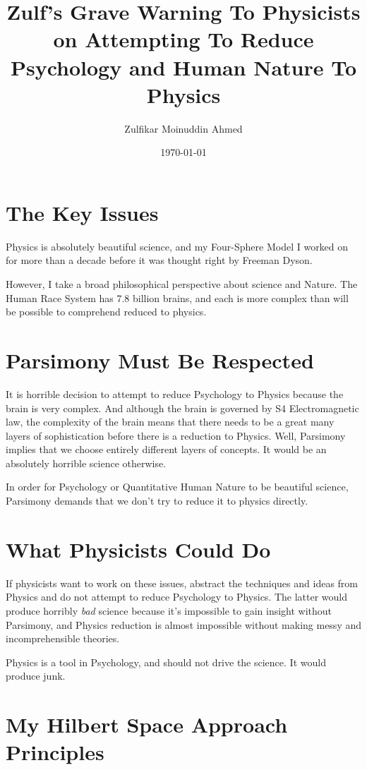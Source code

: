 \documentclass{amsart}
\title{Zulf's Grave Warning To Physicists on Attempting To Reduce Psychology and Human Nature To Physics}
\author{Zulfikar Moinuddin Ahmed}
\date{\today}
\begin{document}
\maketitle
\section{The Key Issues}
Physics is absolutely beautiful science, and my Four-Sphere Model I worked on for more than a decade before it was thought right by Freeman Dyson.

However, I take a broad philosophical perspective about science and Nature.  The Human Race System has 7.8 billion brains, and each is more complex than will be possible to comprehend reduced to physics.  

\section{Parsimony Must Be Respected}

It is horrible decision to attempt to reduce Psychology to Physics because the brain is very complex.  And although the brain is governed by S4 Electromagnetic law, the complexity of the brain means that there needs to be a great many layers of sophistication before there is a reduction to Physics.  Well, Parsimony implies that we choose entirely different layers of concepts.  It would be an absolutely horrible science otherwise.  

In order for Psychology or Quantitative Human Nature to be beautiful science, Parsimony demands that we don't try to reduce it to physics directly.

\section{What Physicists Could Do}
If physicists want to work on these issues, abstract the techniques and ideas from Physics and do not attempt to reduce Psychology to Physics.  The latter would produce horribly {\em bad} science because it's impossible to gain insight without Parsimony, and Physics reduction is almost impossible without making messy and incomprehensible theories.  

Physics is a tool in Psychology, and should not drive the science. It would produce junk.

\section{My Hilbert Space Approach Principles}
\end{document}
